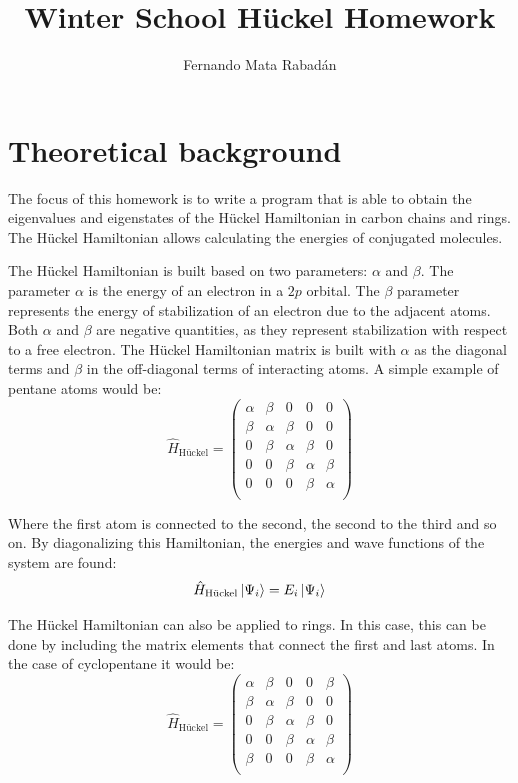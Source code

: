 \documentclass{article}
\title{Winter School Hückel Homework}
\author{Fernando Mata Rabadán}
\date{}
\begin{document}
\maketitle


\section{Theoretical background}
The focus of this homework is to write a program that is able to obtain the eigenvalues and eigenstates of the Hückel Hamiltonian in carbon chains and rings. The Hückel Hamiltonian allows calculating the energies of conjugated molecules. 

The Hückel Hamiltonian is built based on two parameters: $\alpha$ and $\beta$. The parameter $\alpha$ is the energy of an electron in a $2p$ orbital. The $\beta$ parameter represents the energy of stabilization of an electron due to the adjacent atoms. Both $\alpha$ and $\beta$ are negative quantities, as they represent stabilization with respect to a free electron. The Hückel Hamiltonian matrix is built with $\alpha$ as the diagonal terms and $\beta$ in the off-diagonal terms of interacting atoms. A simple example of pentane atoms would be: 
\begin{equation*}
    \hat{H}_{\textrm{Hückel}}  =
    \begin{pmatrix}
        \alpha & \beta & 0 & 0 & 0 \\
        \beta & \alpha & \beta & 0 & 0 \\
        0 & \beta & \alpha & \beta & 0 \\
        0 & 0 & \beta & \alpha & \beta \\
        0 & 0 & 0 & \beta & \alpha \\
    \end{pmatrix}
\end{equation*}
    
Where the first atom is connected to the second, the second to the third and so on. By diagonalizing this Hamiltonian, the energies and wave functions of the system are found:
\begin{equation*}
    \hat{H}_{\textrm{Hückel}}\ket{\Psi_i}   =  E_{i}\ket{\Psi_i}
\end{equation*}

The Hückel Hamiltonian can also be applied to rings. In this case, this can be done by including the matrix elements that connect the first and last atoms. In the case of cyclopentane it would be: 
\begin{equation*}
    \hat{H}_{\textrm{Hückel}}  =
    \begin{pmatrix}
        \alpha & \beta & 0 & 0 & \beta \\
        \beta & \alpha & \beta & 0 & 0 \\
        0 & \beta & \alpha & \beta & 0 \\
        0 & 0 & \beta & \alpha & \beta \\
        \beta & 0 & 0 & \beta & \alpha \\
    \end{pmatrix}
\end{equation*}
\end{document}
